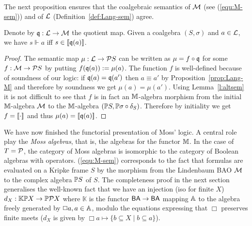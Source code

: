 \documentclass{book}
\begin{document}
The next proposition ensures that the coalgebraic semantics of $\mathcal{M}$
(see (\ref{equ:M-sem})) and of $\mathcal{L}$ (Definition~\ref{def:Lang-sem})
agree.

\begin{proposition}\label{prop:Lang-M-sem}
  Denote by $\mathfrak{q}:\mathcal{L}\to\mathcal{M}$ the quotient map.  Given a coalgebra
  $(S,\sigma)$ and $a\in\mathcal{L}$, we have $s\Vdash a$ iff
  $s\in\mathopen{[\![} \mathfrak{q}(a) \mathclose{]\!]}$.
\end{proposition}

\xxviproofspace
\begin{proof}
  The semantic map $\mu:\mathcal{L} \to \mathcal{P} S$ can be written as $\mu= f
  \circ \mathfrak{q}$ for some $f: \mathcal{M} \to \mathcal{P} S$ by putting $f(\mathfrak{q}(a))
  \mathrel{:=} \mu(a)$.  The function $f$ is well-defined because of
  soundness of our logic: if $\mathfrak{q}(a) = \mathfrak{q}(a')$ then $a \equiv a'$
  by Proposition~\ref{prop:Lang-M} and therefore by soundness we get
  $\mu(a) = \mu(a')$.  Using Lemma~\ref{l:altsem} it is not
  difficult to see that $f$ is in fact an $\mathbb{M}$-algebra morphism from
  the initial $\mathbb{M}$-algebra $\mathcal{M}$ to the $\mathbb{M}$-algebra $(\mathbb{P} S, \mathbb{P}
  \sigma \circ \delta_S)$.  Therefore by initiality we get
  $f=\mathopen{[\![} \cdot \mathclose{]\!]}$ and thus $\mu(a)=\mathopen{[\![} \mathfrak{q}(a) \mathclose{]\!]}$.
\end{proof}

%

\begin{remark}
  We have now finished the functorial presentation of Moss' logic. A
  central role play the \emph{Moss algebras}, that is, the algebras
  for the functor $\mathbb{M}$. In the case of $T=\mathcal{P}$, the category of Moss
  algebras is isomorphic to the category of Boolean algebras with
  operators. (\ref{equ:M-sem}) corresponds to the fact that formulas
  are evaluated on a Kripke frame $S$ by the morphism from the
  Lindenbaum BAO $\mathcal{M}$ to the complex algebra $\mathbb{P} S$ of $S$. The
  completeness proof in the next section generalises the well-known
  fact that we have an injection (iso for finite $X$)
  $d_X:\mathbb{K}\mathbb{P} X \to \mathbb{P}\mathcal{P} X$ where $\mathbb{K}$ is the
  functor $\mathsf{BA}\to\mathsf{BA}$ mapping $\mathbb{A}$ to the algebra freely generated
  by $\Box a, a\in\mathbb{A}$, modulo the equations expressing that $\Box$
  preserves finite meets ($d_X$ is given by $\Box
  a\mapsto\{b\subseteq X \mid b\subseteq a\}$).
\end{remark}
\end{document}
